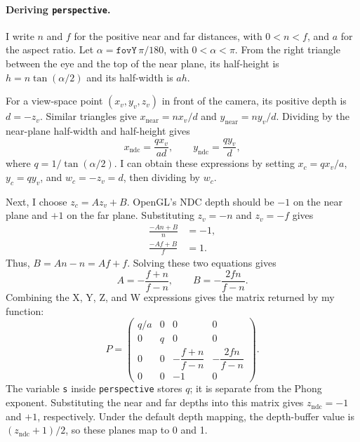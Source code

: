 \documentclass[acmtog]{acmart}
\begin{document}
\paragraph{Deriving \texttt{perspective}.}
I write $n$ and $f$ for the positive near and far distances, with $0<n<f$, and $a$ for the aspect ratio. Let $\alpha=\texttt{fovY}\,\pi/180$, with $0<\alpha<\pi$. From the right triangle between the eye and the top of the near plane, its half-height is $h=n\tan(\alpha/2)$ and its half-width is $ah$.

For a view-space point $(x_v,y_v,z_v)$ in front of the camera, its positive depth is $d=-z_v$. Similar triangles give $x_{\mathrm{near}}=nx_v/d$ and $y_{\mathrm{near}}=ny_v/d$. Dividing by the near-plane half-width and half-height gives
\begin{equation}
x_{\mathrm{ndc}}=\frac{q x_v}{a d},
\qquad
y_{\mathrm{ndc}}=\frac{q y_v}{d},
\end{equation}
where $q=1/\tan(\alpha/2)$. I can obtain these expressions by setting $x_c=qx_v/a$, $y_c=qy_v$, and $w_c=-z_v=d$, then dividing by $w_c$.

Next, I choose $z_c=Az_v+B$. OpenGL's NDC depth should be $-1$ on the near plane and $+1$ on the far plane. Substituting $z_v=-n$ and $z_v=-f$ gives
\begin{equation}
\begin{aligned}
\frac{-An+B}{n}&=-1,\\
\frac{-Af+B}{f}&=1.
\end{aligned}
\end{equation}
Thus, $B=An-n=Af+f$. Solving these two equations gives
\begin{equation}
A=-\frac{f+n}{f-n},
\qquad B=-\frac{2fn}{f-n}.
\end{equation}
Combining the X, Y, Z, and W expressions gives the matrix returned by my function:
\begin{equation}
P=
\begin{pmatrix}
q/a&0&0&0\\
0&q&0&0\\
0&0&-\dfrac{f+n}{f-n}&-\dfrac{2fn}{f-n}\\[4pt]
0&0&-1&0
\end{pmatrix}.
\end{equation}
The variable \texttt{s} inside \texttt{perspective} stores $q$; it is separate from the Phong exponent. Substituting the near and far depths into this matrix gives $z_{\mathrm{ndc}}=-1$ and $+1$, respectively. Under the default depth mapping, the depth-buffer value is $(z_{\mathrm{ndc}}+1)/2$, so these planes map to 0 and 1.
\end{document}
